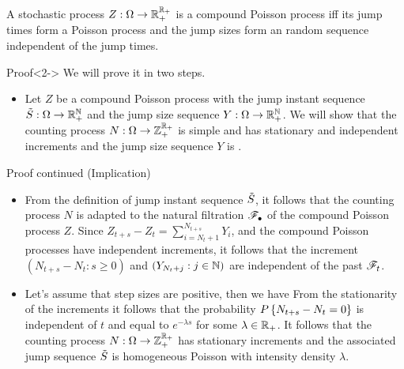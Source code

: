 \documentclass[12pt,aspectratio=169]{beamer}
\begin{document}
\begin{frame}
\begin{prop}
A stochastic process $Z:\Omega\to\mathbb{R}_+^{\mathbb{R}_+}$ is a compound Poisson process iff its jump times form a Poisson process and the jump sizes form an \iid random sequence independent of the jump times. 
\end{prop}
\begin{block}{Proof}<2->
We will prove it in two steps. 
\begin{itemize} 
\item[Implication:] 
Let $Z$ be a compound Poisson process with the jump instant sequence $\tilde{S}:\Omega\to\mathbb{R}_+^{\mathbb{N}}$ and the jump size sequence $Y:\Omega\to\mathbb{R}_+^{\mathbb{N}}$. 
We will show that the counting process $N:\Omega\to\mathbb{Z}_+^{\mathbb{R}_+}$ is simple and has stationary and independent increments and the jump size sequence $Y$ is \iid. 
\end{itemize}
\end{block}
\end{frame}

\begin{frame}
\begin{block}{Proof continued (Implication)}
\begin{itemize}
\item[Independence of jumps and increments:] 
From the definition of jump instant sequence $\tilde{S}$, it follows that the counting process $N$ is adapted to the natural filtration $\mathscr{F}_\bullet$ of the compound Poisson process $Z$. 
Since $Z_{t+s} - Z_t = \sum_{i = N_t+1}^{N_{t+s}}Y_i$, and the compound Poisson processes have independent increments, 
it follows that the increment $(N_{t+s}-N_t: s \ge 0)$ and $(Y_{N_t+j}: j \in \mathbb{N})$ are independent of the past $\mathscr{F}_t$. %
\item[Stationarity:]<2-> Let's assume that step sizes are positive, then
we have 
From the stationarity of the increments it follows that the probability $P\left\{N_{t+s}-N_t = 0\right\}$ is independent of $t$ and equal to $e^{-\lambda s}$ for some $\lambda \in \mathbb{R}_+$.  
It follows that the counting process $N:\Omega\to\mathbb{Z}_+^{\mathbb{R}_+}$ has stationary increments and the associated jump sequence $\tilde{S}$ is homogeneous Poisson with intensity density $\lambda$. 
\end{itemize}
\end{block}
\end{frame}
\end{document}
